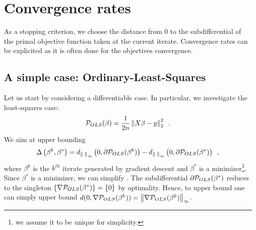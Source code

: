 \documentclass[../main.tex]{subfiles}
\begin{document}
\chapter{Convergence rates}\label{chap:an_cv}

As a stopping criterion, we choose the distance from $0$ to the
subdifferential of the primal objective function taken at the current iterate.
Convergence rates can be explicited as it is often done for the objectives
convergence.

\section{A simple case: Ordinary-Least-Squares}
\label{sec:a_simple_case_ordinary_least_squares}

Let us start by considering a differentiable case.
In particular, we investigate the least-squares case:
\begin{align*}
    \mathcal{P}_{OLS}(\beta) = \frac{1}{2n}\left \lVert X\beta - y \right \rVert^2_2 \enspace.
\end{align*}
We aim at upper bounding
\begin{align}\label{eq:diff_dist}
    \Delta\left(\beta^k, \beta^*\right)
    =
    d_{\left \lVert \cdot \right \rVert_\infty}\left(0, \partial\mathcal{P}_{OLS}(\beta^k)\right) -
    d_{\left \lVert \cdot \right \rVert_\infty}\left(0, \partial \mathcal{P}_{OLS}(\beta^{*\!\!\!\phantom{k}})\right) \enspace,
\end{align}
where $\beta^k$ is the $k^{th}$ iterate generated by gradient descent
and $\beta^*$ is a minimizer\footnote{we assume it to be unique for simplicity.}.
Since $\beta^*$ is a minimizer, we can simplify .
The subdifferential $\partial\mathcal{P}_{OLS}(\beta^*)$ reduces to the singleton
$\{\nabla\mathcal{P}_{OLS}(\beta^*)\}=\{0\}$ by optimality.
Hence, to upper bound  one can simply upper bound
$d(0, \nabla \mathcal{P}_{OLS}(\beta^k))=\left \lVert \nabla \mathcal{P}_{OLS}(\beta^k) \right \rVert_\infty$.
\end{document}

